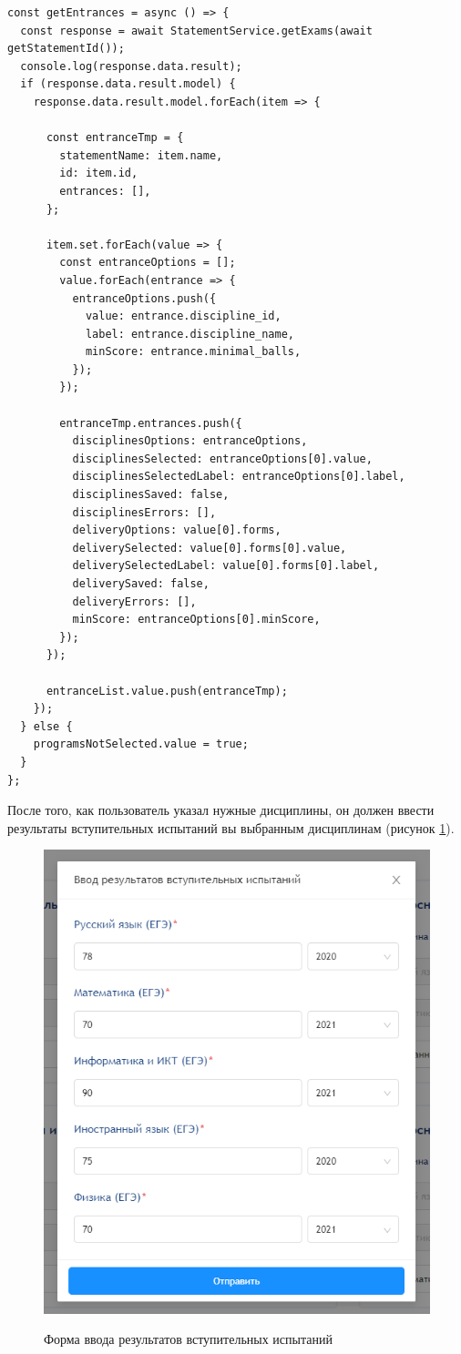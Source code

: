 \begin{lstlisting}[caption={Метод загружающий список вступительных испытаний}, label={ls:egelist}]
const getEntrances = async () => {
  const response = await StatementService.getExams(await getStatementId());
  console.log(response.data.result);
  if (response.data.result.model) {
    response.data.result.model.forEach(item => {

      const entranceTmp = {
        statementName: item.name,
        id: item.id,
        entrances: [],
      };

      item.set.forEach(value => {
        const entranceOptions = [];
        value.forEach(entrance => {
          entranceOptions.push({
            value: entrance.discipline_id,
            label: entrance.discipline_name,
            minScore: entrance.minimal_balls,
          });
        });

        entranceTmp.entrances.push({
          disciplinesOptions: entranceOptions,
          disciplinesSelected: entranceOptions[0].value,
          disciplinesSelectedLabel: entranceOptions[0].label,
          disciplinesSaved: false,
          disciplinesErrors: [],
          deliveryOptions: value[0].forms,
          deliverySelected: value[0].forms[0].value,
          deliverySelectedLabel: value[0].forms[0].label,
          deliverySaved: false,
          deliveryErrors: [],
          minScore: entranceOptions[0].minScore,
        });
      });

      entranceList.value.push(entranceTmp);
    });
  } else {
    programsNotSelected.value = true;
  }
};
\end{lstlisting}

После того, как пользователь указал нужные дисциплины, он должен ввести результаты вступительных испытаний вы выбранным дисциплинам (рисунок \ref{fig:egescoreinput}).

\begin{figure}[H]
\begin{center}
\includegraphics[width=0.6\hsize]{fig/ege-input-result.png}\\[2mm]
\caption{Форма ввода результатов вступительных испытаний}\label{fig:egescoreinput}
\end{center}
\end{figure}


